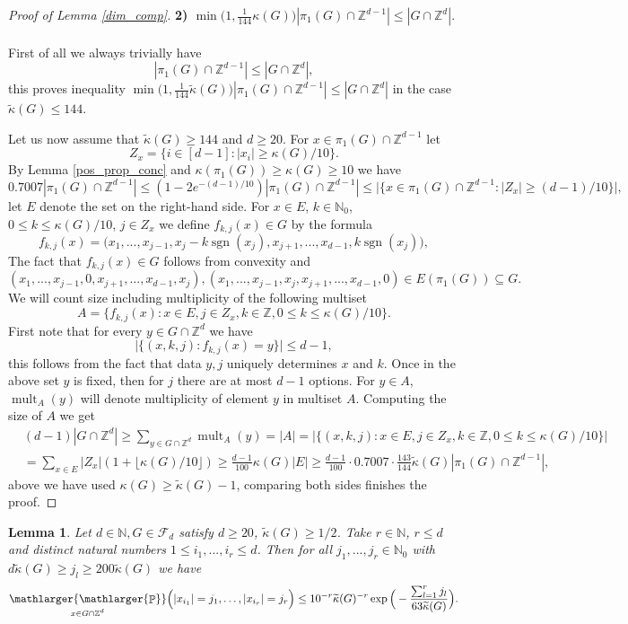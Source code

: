\documentclass[a4paper,oneside, reqno]{amsart}
\numberwithin{equation}{section}
\newtheorem{Lem}[Thm]{Lemma}
\theoremstyle{definition}%
\theoremstyle{definition}
\theoremstyle{definition}%
\theoremstyle{definition}
\newcommand{\Pro}{\mathop{\mathbb{P}}}
\newcommand{\Z}{\mathbb{Z}}
\newcommand{\N}{\mathbb{N}}
\DeclareMathOperator{\sgn}{sgn}
\DeclareMathOperator{\mult}{mult}
\newcommand{\spr}[1]{\underset{_{\substack{#1}}}{\mathlarger{\mathlarger{\Pro}}}}
\begin{document}
\begin{proof}[Proof of Lemma \ref{dim_comp}]
\textbf{2) $ \min\big(1,\frac{1}{144}\kappa(G)\big) |\pi_1(G) \cap \Z^{d-1}| \le  |G \cap \Z^d|$}. \\
\\
First of all we always trivially have
\[
|\pi_1(G) \cap \Z^{d-1}| \le  |G \cap \Z^d|,
\]
this proves inequality $\min\big(1,\frac{1}{144}\widetilde{\kappa}(G)\big)|\pi_1(G) \cap \Z^{d-1}| \le  |G \cap \Z^d|$ in the case $\widetilde{\kappa}(G) \le 144 $. \par
Let us now assume that $\widetilde{\kappa}(G) \ge 144$ and $d \ge 20$.
For $x \in \pi_1(G) \cap \Z^{d-1} $ let 
\[
Z_x= \big\{ i \in [d-1]: |x_i| \ge \kappa(G)/10 \big\}.
\]
By Lemma \ref{pos_prop_conc} and $\kappa(\pi_1(G)) \ge \kappa(G) \ge 10$ we have
\[
0.7007|\pi_1(G) \cap \Z^{d-1}| \le(1-2e^{-(d-1)/10})|\pi_1(G) \cap \Z^{d-1}| \le  \Big| \Big\{ x \in \pi_1(G) \cap \Z^{d-1}: |Z_x| \ge (d-1)/10\Big\} \Big|,
\]
let $E$ denote the set on the right-hand side. For $x \in E$, $k \in \N_0$, $0 \le k \le \kappa(G)/10$, $j \in Z_x$ we define $f_{k,j}(x) \in G$ by the formula
\[
f_{k,j}(x)=\Big(x_1,...,x_{j-1},x_j-k\sgn(x_j), x_{j+1},...,x_{d-1}, k\sgn(x_j) \Big),
\]
The fact that $f_{k,j}(x) \in G$ follows from convexity and  
\[
(x_1,...,x_{j-1},0,x_{j+1},...,x_{d-1},x_j), (x_1,...,x_{j-1},x_j,x_{j+1},...,x_{d-1},0) \in E(\pi_1(G)) \subseteq G.
\]
We will count size including multiplicity of the following multiset 
\[
A=\Big\{ f_{k,j}(x): x \in E, j \in Z_x, k \in \Z, 0 \le k \le \kappa(G)/10\Big\}.
\]
First note that for every $y  \in G \cap \Z^d$ we have
\[
\Big| \Big\{ (x,k,j): f_{k,j}(x)=y \Big\} \Big| \le d-1,
\]
this follows from the fact that data $y,j$ uniquely determines $x$ and $k$. Once in the above set $y$ is fixed, then for $j$ there are at most $d-1$ options. For $y \in A$, $\mult_A(y)$ will denote multiplicity of element $y$ in multiset $A$. Computing the size of $A$ we get 
\begin{align*}
    &(d-1)|G \cap \Z^d| \ge \sum_{y \in G \cap \Z^d} \mult_A(y) = |A|= \Big|\Big\{ (x,k,j): x \in E, j \in Z_x, k \in \Z, 0 \le k \le \kappa(G)/10 \Big\} \Big| \\
    &= \sum_{x \in E} |Z_x| (1+ \lfloor \kappa(G)/10 \rfloor) \ge\frac{d-1}{100} \kappa(G) |E| \ge \frac{d-1}{100}\cdot0.7007 \cdot \frac{143}{144}\widetilde{\kappa}(G) |\pi_1(G) \cap \Z^{d-1}|,
\end{align*}
above we have used $\kappa(G) \ge  \widetilde{\kappa}(G)-1$, comparing both sides finishes the proof.
\end{proof}
\begin{Lem} \label{big_coord}
    Let $d \in \N, G \in \mathcal{F}_d$ satisfy $d \ge 20$, $\widetilde{\kappa}(G) \ge 1/2$. Take $r \in \N$, $r \le d$ and distinct natural numbers $1 \le i_1,...,i_r \le d$. Then for all $j_1,...,j_r \in \N_0$ with $d\widetilde{\kappa}(G) \ge j_l \ge 200 \widetilde{\kappa}(G)$ we have
    \[
    \spr{x \in G \cap \Z^d} \Big( |x_{i_1}|=j_1, \ldots,|x_{i_r}|=j_r \Big) \le  10^{-r}\widetilde{\kappa}(G)^{-r}\exp\Big(- \frac{\sum_{l=1}^rj_l}{63\widetilde{\kappa}(G)} \Big) .
    \]
\end{Lem}
\end{document}
